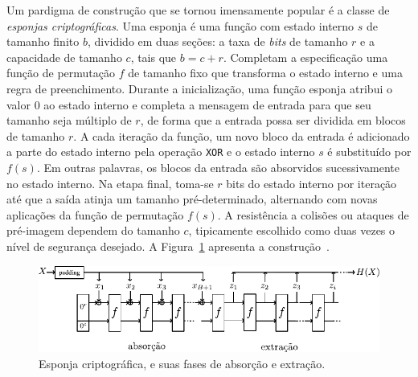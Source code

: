 Um pardigma de construção que se tornou imensamente popular é a classe de \emph{esponjas criptográficas}. Uma esponja é uma função com estado interno $s$ de tamanho finito $b$, dividido em duas seções: a taxa de \emph{bits} de tamanho $r$ e a capacidade de tamanho $c$, tais que $b = c + r$. Completam a especificação uma função de permutação $f$ de tamanho fixo que transforma o estado interno e uma regra de preenchimento. Durante a inicialização, uma função esponja atribui o valor 0 ao estado interno e completa a mensagem de entrada para que seu tamanho seja múltiplo de $r$, de forma que a entrada possa ser dividida em blocos de tamanho $r$. A cada iteração da função, um novo bloco da entrada é adicionado a parte do estado interno pela operação \texttt{XOR} e o estado interno $s$ é substituído por $f(s)$. Em outras palavras, os blocos da entrada são absorvidos sucessivamente no estado interno. Na etapa final, toma-se $r$ bits do estado interno por iteração até que a saída atinja um tamanho pré-determinado, alternando com novas aplicações da função de permutação $f(s)$. A resistência a colisões ou ataques de pré-imagem dependem do tamanho $c$, tipicamente escolhido como duas vezes o nível de segurança desejado. A Figura~\ref{fig:sponge} apresenta a construção~\cite{BertoniDPA08}.

\begin{figure}[htbp]
\begin{center}
    \includegraphics{figures/sponge.pdf}
    \caption{Esponja criptográfica, e suas fases de absorção e extração.}
    \label{fig:sponge}
\end{center}
\end{figure}







